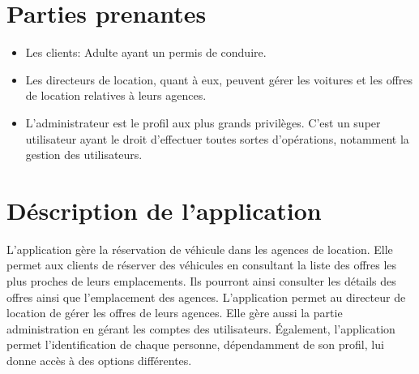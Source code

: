 \documentclass[12pt,a4paper]{report}
\begin{document}
		\section{Parties prenantes}
			\begin{itemize}
				\item Les clients: Adulte ayant un permis de conduire.
				\item Les directeurs de location, quant à eux, peuvent gérer les voitures et les offres de location relatives à leurs agences.
				\item L'administrateur est le profil aux plus grands privilèges. C'est un super utilisateur ayant le droit d'effectuer toutes sortes d'opérations, notamment la gestion des utilisateurs.

			\end{itemize}
		


		\section{Déscription de l'application}
L’application gère la réservation de véhicule dans les agences de location. Elle permet aux clients de réserver des véhicules en consultant la liste des offres les plus proches de leurs emplacements. Ils pourront ainsi consulter les détails des offres ainsi que l’emplacement des agences.
L’application permet au directeur de location de gérer les offres de leurs agences. Elle gère aussi la partie administration en gérant les comptes des utilisateurs. 
Également, l’application permet l’identification de chaque personne, dépendamment de son profil, lui donne accès à des options différentes.



\end{document}
